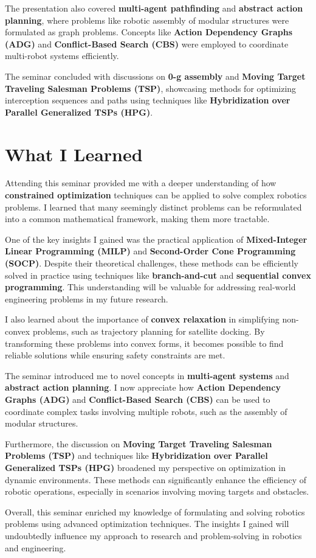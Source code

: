 \documentclass{article}
\begin{document}
The presentation also covered \textbf{multi-agent pathfinding} and \textbf{abstract action planning}, where problems like robotic assembly of modular structures were formulated as graph problems. Concepts like \textbf{Action Dependency Graphs (ADG)} and \textbf{Conflict-Based Search (CBS)} were employed to coordinate multi-robot systems efficiently.

The seminar concluded with discussions on \textbf{0-g assembly} and \textbf{Moving Target Traveling Salesman Problems (TSP)}, showcasing methods for optimizing interception sequences and paths using techniques like \textbf{Hybridization over Parallel Generalized TSPs (HPG)}.

\section{What I Learned}
Attending this seminar provided me with a deeper understanding of how \textbf{constrained optimization} techniques can be applied to solve complex robotics problems. I learned that many seemingly distinct problems can be reformulated into a common mathematical framework, making them more tractable.

One of the key insights I gained was the practical application of \textbf{Mixed-Integer Linear Programming (MILP)} and \textbf{Second-Order Cone Programming (SOCP)}. Despite their theoretical challenges, these methods can be efficiently solved in practice using techniques like \textbf{branch-and-cut} and \textbf{sequential convex programming}. This understanding will be valuable for addressing real-world engineering problems in my future research.

I also learned about the importance of \textbf{convex relaxation} in simplifying non-convex problems, such as trajectory planning for satellite docking. By transforming these problems into convex forms, it becomes possible to find reliable solutions while ensuring safety constraints are met.

The seminar introduced me to novel concepts in \textbf{multi-agent systems} and \textbf{abstract action planning}. I now appreciate how \textbf{Action Dependency Graphs (ADG)} and \textbf{Conflict-Based Search (CBS)} can be used to coordinate complex tasks involving multiple robots, such as the assembly of modular structures.

Furthermore, the discussion on \textbf{Moving Target Traveling Salesman Problems (TSP)} and techniques like \textbf{Hybridization over Parallel Generalized TSPs (HPG)} broadened my perspective on optimization in dynamic environments. These methods can significantly enhance the efficiency of robotic operations, especially in scenarios involving moving targets and obstacles.

Overall, this seminar enriched my knowledge of formulating and solving robotics problems using advanced optimization techniques. The insights I gained will undoubtedly influence my approach to research and problem-solving in robotics and engineering.
\end{document}
